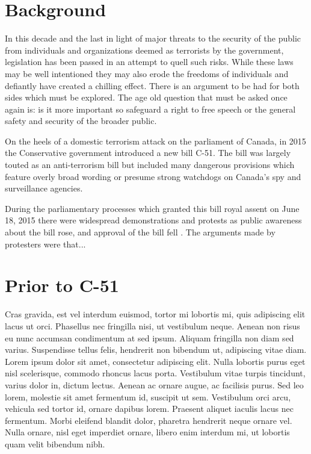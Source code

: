 \documentclass[a4paper, 11pt]{article} %
\begin{document}

\section*{Background}
In this decade and the last in light of major threats to the security of the public from individuals and organizations deemed as terrorists by the government, legislation has been passed in an attempt to quell such risks. While these laws may be well intentioned they may also erode the freedoms of individuals and defiantly have created a chilling effect. There is an argument to be had for both sides which must be explored. The age old question that must be asked once again is: is it more important so safeguard a right to free speech or the general safety and security of the broader public.

On the heels of a domestic terrorism attack on the parliament of Canada, in 2015 the Conservative government introduced a new bill C-51. The bill was largely touted as an anti-terrorism bill but included many dangerous provisions which feature overly broad wording or presume strong watchdogs on Canada's spy and surveillance agencies.

During the parliamentary processes which granted this bill royal assent on June 18, 2015 there were widespread demonstrations and protests as public awareness about the bill rose, and approval of the bill fell \cite{haydn_watters_5_2015}. The arguments made by protesters were that...


\section*{Prior to C-51}

Cras gravida, est vel interdum euismod, tortor mi lobortis mi, quis adipiscing elit lacus ut orci. Phasellus nec fringilla nisi, ut vestibulum neque. Aenean non risus eu nunc accumsan condimentum at sed ipsum.
Aliquam fringilla non diam sed varius. Suspendisse tellus felis, hendrerit non bibendum ut, adipiscing vitae diam. Lorem ipsum dolor sit amet, consectetur adipiscing elit. Nulla lobortis purus eget nisl scelerisque, commodo rhoncus lacus porta. Vestibulum vitae turpis tincidunt, varius dolor in, dictum lectus. Aenean ac ornare augue, ac facilisis purus. Sed leo lorem, molestie sit amet fermentum id, suscipit ut sem. Vestibulum orci arcu, vehicula sed tortor id, ornare dapibus lorem. Praesent aliquet iaculis lacus nec fermentum. Morbi eleifend blandit dolor, pharetra hendrerit neque ornare vel. Nulla ornare, nisl eget imperdiet ornare, libero enim interdum mi, ut lobortis quam velit bibendum nibh.
\end{document}
